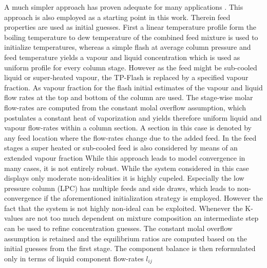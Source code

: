         A much simpler approach has proven adequate for many applications \cite{Henley.op.2011}.
        This approach is also employed as a starting point in this work.
        Therein feed properties are used as initial guesses. First a linear temperature profile form the boiling
        temperature to dew temperature of the combined feed mixture is used to initialize temperatures, whereas a simple flash
        at average column pressure and feed temperature yields a vapour and liquid concentration which is
        used as uniform profile for every column stage. However as the feed might be sub-cooled liquid or
        super-heated vapour, the TP-Flash is replaced by a specified vapour fraction. As vapour fraction
        for the flash initial estimates of the vapour and liquid flow rates at the top and bottom of the
        column are used. The stage-wise molar flow-rates are computed from the constant molal overflow
        assumption, which postulates a constant heat of vaporization and yields therefore uniform
        liquid and vapour flow-rates within a column section. A section in this case is denoted by any
        feed location where the flow-rates change due to the added feed. In the feed stages a super heated
        or sub-cooled feed is also considered by means of an extended vapour fraction
        While this approach leads to model convergence in many cases, it is not entirely robust.
        While the system considered in this case displays only moderate non-idealities it is highly cupeled.
        Especially the low pressure column (LPC) has multiple feeds and side draws, which leads to non-convergence
        if the aforementioned initialization strategy is employed. However the fact that the system is
        not highly non-ideal can be exploited. Whenever the K-values are not too much dependent on mixture
        composition an intermediate step can be used to refine concentration guesses. The constant molal
        overflow assumption is retained and the equilibrium ratios are computed based on the initial guesses
        from the first stage. The component balance is then reformulated only in terms of liquid component
        flow-rates $l_{ij}$
